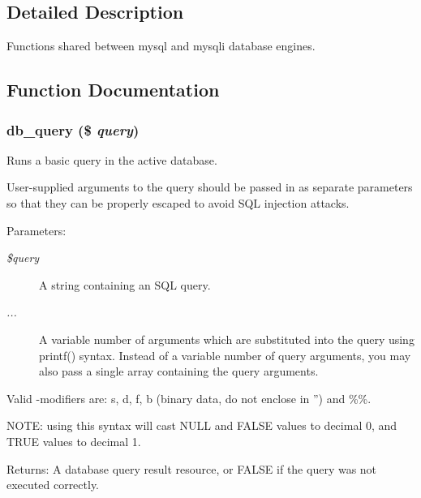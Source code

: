 \subsection{Detailed Description}
Functions shared between mysql and mysqli database engines. 

\subsection{Function Documentation}
\hypertarget{database_8mysql-common_8inc_9e096321b86945d128746ac7bedce8f3}{
\subsubsection[{db\_\-query}]{\setlength{\rightskip}{0pt plus 5cm}db\_\-query (\$ {\em query})}}
\label{database_8mysql-common_8inc_9e096321b86945d128746ac7bedce8f3}


Runs a basic query in the active database.

User-supplied arguments to the query should be passed in as separate parameters so that they can be properly escaped to avoid SQL injection attacks.

\begin{Desc}
\item[Parameters:]
\begin{description}
\item[{\em \$query}]A string containing an SQL query. \item[{\em ...}]A variable number of arguments which are substituted into the query using printf() syntax. Instead of a variable number of query arguments, you may also pass a single array containing the query arguments.\end{description}
\end{Desc}
Valid -modifiers are: s, d, f, b (binary data, do not enclose in '') and \%\%.

NOTE: using this syntax will cast NULL and FALSE values to decimal 0, and TRUE values to decimal 1.

\begin{Desc}
\item[Returns:]A database query result resource, or FALSE if the query was not executed correctly. \end{Desc}
